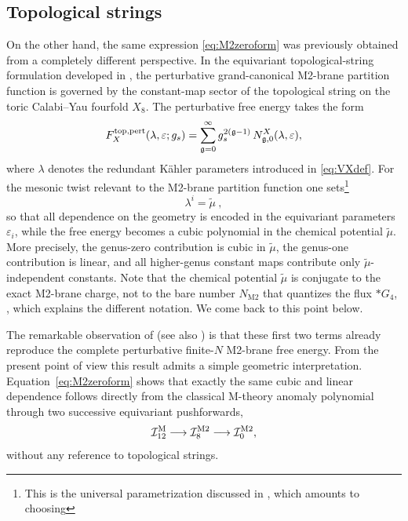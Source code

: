 \documentclass[11pt,a4paper]{article}
\def\cI{{\cal I}}
\theoremstyle{definition}
\theoremstyle{identity}
\theoremstyle{remark}
\newcommand{\be}{\begin{equation}}
\newcommand{\ee}{\end{equation}}
\begin{document}
\subsection*{Topological strings}
On the other hand, the same expression \eqref{eq:M2zeroform} was previously obtained from a
completely different perspective. In the equivariant topological-string formulation developed in
\cite{Cassia:2025aus,Cassia:2025jkr}, the perturbative grand-canonical M2-brane partition
function is governed by the constant-map sector of the topological string on the toric
Calabi--Yau fourfold $X_8$. The perturbative free energy takes the form
\be
\label{eq:pertstring}
F^{\rm top,pert}_X(\lambda,\varepsilon;g_s)
=
\sum_{\mathfrak g=0}^{\infty}
g_s^{2(\mathfrak g-1)}
\,N^{X}_{\mathfrak g,0}(\lambda,\varepsilon),
\ee
where $\lambda$ denotes the redundant K\"ahler parameters introduced in
\eqref{eq:VXdef}. For the mesonic twist relevant to the M2-brane partition function one
sets\footnote{This is the universal parametrization discussed in \cite{Cassia:2025aus}, which amounts to choosing}
\begin{equation}
\lambda^i=\tilde \mu\ ,
\end{equation}
so that all dependence on the geometry is encoded in the equivariant parameters
$\varepsilon_i$, while the free energy becomes a cubic polynomial in the chemical potential
$\tilde \mu$. More precisely, the genus-zero contribution is cubic in $\tilde \mu$, the genus-one
contribution is linear, and all higher-genus constant maps contribute only $\tilde \mu$-independent
constants. Note that the chemical potential $\tilde \mu$ is conjugate to the exact M2-brane charge, not to the bare number $N_\text{M2}$ that quantizes the flux $*G_4$, \cite{Cassia:2025aus}, which explains the different notation. We come back to this point below.

The remarkable observation of \cite{Cassia:2025jkr} (see also \cite{Hristov:2026zjh}) is that these first two terms already
reproduce the complete perturbative finite-$N$ M2-brane free energy. From the present point of
view this result admits a simple geometric interpretation. Equation~\eqref{eq:M2zeroform}
shows that exactly the same cubic and linear dependence follows directly from the classical
M-theory anomaly polynomial through two successive equivariant pushforwards,
\be
\cI^{\rm M}_{12}
\longrightarrow
\cI^{\rm M2}_{8}
\longrightarrow
\cI^{\rm M2}_{0},
\ee
without any reference to topological strings.
\end{document}
